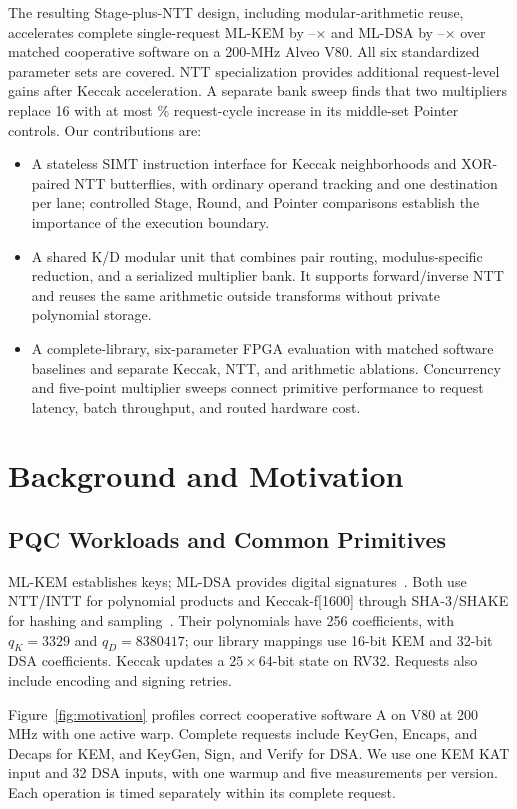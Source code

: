 \documentclass[conference,letterpaper]{IEEEtran}
\begin{document}
The resulting Stage-plus-NTT design, including modular-arithmetic reuse,
accelerates complete single-request ML-KEM by
\KemParameterMinOne{}--\KemParameterMaxOne{}$\times$ and ML-DSA by
\DsaParameterMinOne{}--\DsaParameterMaxOne{}$\times$ over matched cooperative
software on a 200-MHz Alveo V80. All six standardized parameter sets are
covered. NTT specialization provides additional request-level gains after
Keccak acceleration. A separate bank sweep finds that two multipliers replace
16 with at most \BankTwoEndToEndMax{}\% request-cycle increase in
its middle-set Pointer controls. Our contributions are:
\begin{itemize}
\item A stateless SIMT instruction interface for Keccak neighborhoods and
XOR-paired NTT butterflies, with ordinary operand tracking and one destination
per lane; controlled Stage, Round, and Pointer comparisons establish the
importance of the execution boundary.
\item A shared K/D modular unit that combines pair routing, modulus-specific
reduction, and a serialized multiplier bank. It supports forward/inverse NTT
and reuses the same arithmetic outside transforms without private polynomial
storage.
\item A complete-library, six-parameter FPGA evaluation with matched software
baselines and separate Keccak, NTT, and arithmetic ablations. Concurrency and
five-point multiplier sweeps connect primitive performance to request latency,
batch throughput, and routed hardware cost.
\end{itemize}

\section{Background and Motivation}
\label{sec:motivation}
\subsection{PQC Workloads and Common Primitives}
ML-KEM establishes keys; ML-DSA provides digital signatures~\cite{fips203,fips204}.
Both use NTT/INTT for polynomial products and Keccak-f[1600] through
SHA-3/SHAKE for hashing and sampling~\cite{fips202}. Their polynomials
have 256 coefficients, with
$q_K=3329$ and $q_D=8380417$; our library mappings use 16-bit KEM and
32-bit DSA coefficients. Keccak updates a $25\times64$-bit state on RV32.
Requests also include encoding and signing retries.

Figure~\ref{fig:motivation} profiles correct cooperative software A on V80
at 200 MHz with one active warp. Complete requests include KeyGen, Encaps,
and Decaps for KEM, and KeyGen, Sign, and Verify for DSA. We use one KEM KAT
input and 32 DSA inputs, with one warmup and five measurements per version.
Each operation is timed separately within its complete request.
\end{document}

